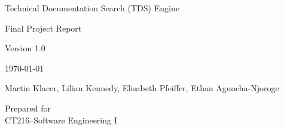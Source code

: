 \documentclass[12pt, a4paper]{article}
\newcommand{\projectname}{Technical Documentation Search (TDS) Engine}
\begin{document}
\begin{titlepage}
    \centering
    \vspace*{4cm}
    {\Large \projectname \par}
    \vspace{2cm}
    {\Large Final Project Report \par}
    \vspace{0.5cm}
    {\Large Version 1.0 \par}
    \vspace{0.5cm}
    {\Large \today \par}
    \vspace{2cm}
    {\Large Martin Klacer, Lilian Kennedy, Elisabeth Pfeiffer, Ethan Aguocha-Njoroge \par}
    \vfill

    Prepared for\\
    CT216--Software Engineering I\par

\end{titlepage}

\tableofcontents
\newpage































\end{document}

